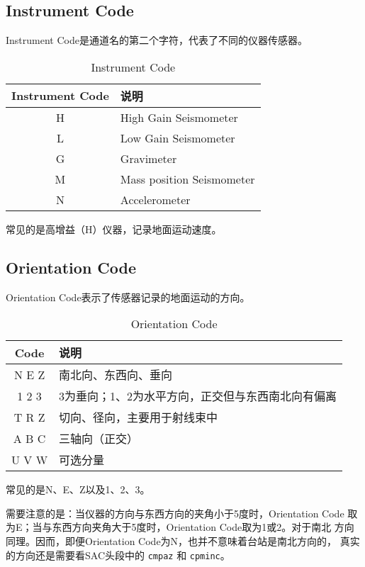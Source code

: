 \subsection{Instrument Code}
Instrument Code是通道名的第二个字符，代表了不同的仪器传感器。
\begin{table}[H]
\centering
\caption{Instrument Code}
\begin{tabular}{cl}
\toprule
Instrument Code    &     说明   \\
\midrule
H        &       High Gain Seismometer      \\
L        &       Low Gain Seismometer       \\
G        &       Gravimeter                 \\
M        &       Mass position Seismometer  \\
N        &       Accelerometer              \\
\bottomrule
\end{tabular}
\end{table}
常见的是高增益（H）仪器，记录地面运动速度。

\subsection{Orientation Code}
Orientation Code表示了传感器记录的地面运动的方向。
\begin{table}[H]
\centering
\caption{Orientation Code}
\begin{tabular}{cl}
\toprule
Code     &     说明   \\
\midrule
N E Z   &   南北向、东西向、垂向   \\
1 2 3   &   3为垂向；1、2为水平方向，正交但与东西南北向有偏离   \\
T R Z   &   切向、径向，主要用于射线束中    \\
A B C   &   三轴向（正交）    \\
U V W   &   可选分量    \\
\bottomrule
\end{tabular}
\end{table}
常见的是N、E、Z以及1、2、3。

需要注意的是：当仪器的方向与东西方向的夹角小于5度时，Orientation Code
取为E；当与东西方向夹角大于5度时，Orientation Code取为1或2。对于南北
方向同理。因而，即便Orientation Code为N，也并不意味着台站是南北方向的，
真实的方向还是需要看SAC头段中的 \texttt{cmpaz} 和 \texttt{cpminc}。
